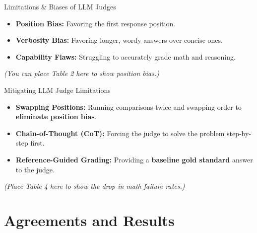 \documentclass[10pt]{beamer}
\begin{document}
\begin{frame}{Limitations \& Biases of LLM Judges}
  \begin{itemize}
    \item \textbf{Position Bias:} Favoring the first response position.
    \item \textbf{Verbosity Bias:} Favoring longer, wordy answers over concise ones.
    \item \textbf{Capability Flaws:} Struggling to accurately grade math and reasoning.
  \end{itemize}
  \vspace{0.3cm}
  \textit{(You can place Table 2 here to show position bias.)}
\end{frame}


\begin{frame}{Mitigating LLM Judge Limitations}
  \begin{itemize}
    \item \textbf{Swapping Positions:} Running comparisons twice and swapping order to \textbf{eliminate position bias}.
    \item \textbf{Chain-of-Thought (CoT):} Forcing the judge to solve the problem step-by-step first.
    \item \textbf{Reference-Guided Grading:} Providing a \textbf{baseline gold standard} answer to the judge.
  \end{itemize}
  \vspace{0.3cm}
  \textit{(Place Table 4 here to show the drop in math failure rates.)}
\end{frame}

\section{Agreements and Results}
\end{document}
